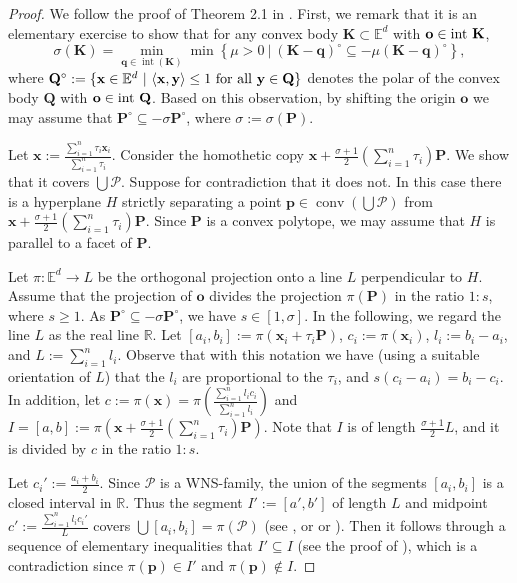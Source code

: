 \documentclass[12pt]{article}
\DeclareMathOperator{\conv}{conv}
\DeclareMathOperator{\inter}{int}
\newcommand{\xx}{\mathbf{x}}
\renewcommand{\Re}{\mathbb{R}}
\newcommand{\Ee}{{\mathbb E}}
\begin{document}
\begin{proof}
We follow the proof of Theorem 2.1 in \cite{ABG}. First, we remark that it is an elementary exercise to show that for any convex body $\mathbf{K} \subset \Ee^d$ with $\mathbf{o}\in{\rm int}\ \mathbf{K}$,
\[
\sigma (\mathbf{K})= \min_{\mathbf{q} \in \inter (\mathbf{K}) } \min \left\{ \mu > 0\ |\  \left( \mathbf{K}-\mathbf{q} \right)^\circ \subseteq -\mu \left( \mathbf{K}-\mathbf{q} \right)^\circ \right\},
\]
where $\mathbf{Q}^\circ:=\{\mathbf{x}\in \Ee^d\ |\ \langle\mathbf{x},\mathbf{y}\rangle\leq 1 \ {\rm for \ all}\ \mathbf{y}\in\mathbf{Q}\}$ denotes the polar of the convex body $\mathbf{Q}$ with $\mathbf{o}\in{\rm int}\ \mathbf{Q}$. Based on this observation, by shifting the origin $\mathbf{o}$ we may assume that $\mathbf{P}^\circ \subseteq -\sigma \mathbf{P}^\circ$, where $\sigma := \sigma(\mathbf{P})$.

Let $\xx:= \frac{\sum_{i=1}^n \tau_i \xx_i}{ \sum_{i=1}^n \tau_i}$. Consider the homothetic copy $\xx +\frac{\sigma+1}{2} \left( \sum_{i=1}^n \tau_i\right) \mathbf{P}$. We show that it covers $\bigcup \mathcal{P}$. Suppose for contradiction that it does not. In this case there is a hyperplane $H$ strictly separating a point $\mathbf{p} \in \conv \left( \bigcup \mathcal{P} \right)$ from $\xx +\frac{\sigma+1}{2} \left( \sum_{i=1}^n \tau_i\right) \mathbf{P}$. Since $\mathbf{P}$ is a convex polytope, we may assume that $H$ is parallel to a facet of $\mathbf{P}$.

Let $\pi: \Ee^d \to L$ be the orthogonal projection onto a line $L$ perpendicular to $H$. Assume that the projection of $\mathbf{o}$ divides the projection $\pi(\mathbf{P})$ in the ratio $1:s$, where $s \geq 1$. As $\mathbf{P}^\circ \subseteq -\sigma \mathbf{P}^\circ$, we have $s \in [1,\sigma]$. 
In the following, we regard the line $L$ as the real line $\Re$. Let $[a_i,b_i] := \pi(\xx_i + \tau_i \mathbf{P})$, $c_i := \pi(\xx_i)$, $l_i := b_i-a_i$, and $L:=\sum_{i=1}^n l_i$. Observe that with this notation we have (using a suitable orientation of $L$) that the $l_i$ are proportional to the $\tau_i$, and $s(c_i-a_i)=b_i-c_i$. In addition, let $c:=\pi\left(\xx\right)=\pi\left(\frac{\sum_{i=1}^n l_i c_i}{ \sum_{i=1}^n l_i}\right)$ and $I=[a,b] := \pi \left( \xx +\frac{\sigma+1}{2} \left( \sum_{i=1}^n \tau_i\right) \mathbf{P}\right)$. Note that $I$ is of length $\frac{\sigma+1}{2}L$, and it is divided by $c$ in the ratio $1:s$.

Let $c_i':=\frac{a_i+b_i}{2}$. Since $\mathcal{P}$ is a WNS-family, the union of the segments $[a_i,b_i]$ is a closed interval in $\Re$. Thus the segment $I':=[a',b']$ of length $L$ and midpoint $c':=\frac{\sum_{i=1}^n l_i c_i'}{L}$ covers $\bigcup [a_i,b_i]=\pi\left(\mathcal{P}\right)$ (see \cite[Lemma]{GG45}, or \cite[Lemma 3]{BezLan16} or \cite[Lemma 1.2]{ABG}). Then it follows through a sequence of elementary inequalities that $I' \subseteq I$ (see the proof of \cite[Theorem 2.1]{ABG}), which is a contradiction since $\pi(\mathbf{p})\in I'$ and $\pi(\mathbf{p})\notin I$.
\end{proof}
\end{document}
